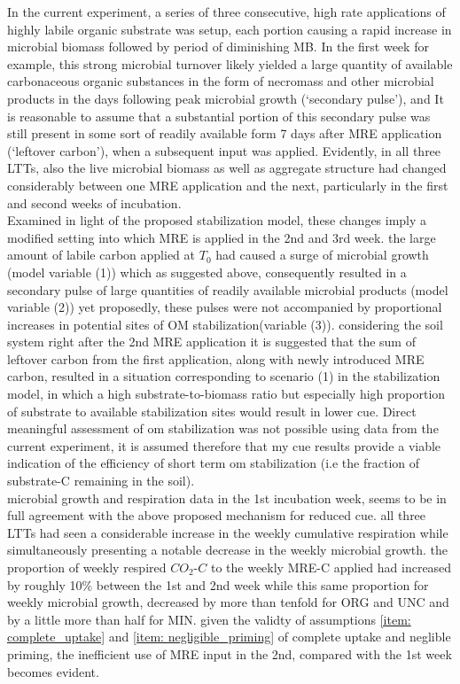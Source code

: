 \documentclass[12pt]{report}
\begin{document}
		In the current experiment, a series of three consecutive, high rate applications of highly labile organic substrate was setup, each portion causing a rapid increase in microbial biomass followed by period of diminishing MB. In the first week for example, this strong microbial turnover likely yielded a large quantity of available carbonaceous organic substances in the form of necromass and other microbial products in the days following peak microbial growth
		(‘secondary pulse’),
		and It is reasonable to assume that a substantial portion of this secondary pulse was still present in some sort of readily available form 7 days after MRE application (‘leftover carbon’), when a subsequent input was applied.
		Evidently, in all three LTTs, also the live microbial biomass as well as  aggregate structure had changed considerably between one MRE application and the next, particularly in the first and second weeks of incubation.\\
		Examined in light of the proposed stabilization model, these changes imply a modified setting into which MRE is applied in the 2nd and 3rd week. the large amount of labile carbon applied at $ T_0 $ had caused a surge of microbial growth (model variable (1)) which as suggested above, consequently resulted in a secondary pulse of large quantities of readily available microbial products (model variable (2)) yet proposedly, these pulses were not accompanied by proportional increases in potential sites of OM stabilization(variable (3)). considering the soil system right after the 2nd MRE application it is suggested that the sum of leftover carbon from the first application, along with newly introduced MRE carbon, resulted in a situation corresponding to scenario (1) in the stabilization model,  in which a high substrate-to-biomass ratio but especially high proportion of substrate to available stabilization sites would result in lower \gls{cue}.
		Direct meaningful  assessment of \gls{om} stabilization was not possible using data from the current experiment,
		it is assumed therefore that my \gls{cue} results provide a viable indication of the efficiency of short term \gls{om} stabilization (i.e the fraction of substrate-C remaining in the soil).\\
		microbial growth and respiration data in the 1st incubation week, seems to be in full agreement with the above proposed mechanism for reduced \gls{cue}. all three LTTs had seen a considerable increase in the weekly cumulative respiration while simultaneously presenting a notable decrease in the weekly microbial growth. the proportion of weekly respired $ CO_2 $-$ C $ to the weekly MRE-C applied had increased by roughly 10\% between the 1st and 2nd week while this same proportion for weekly microbial growth, decreased by more than tenfold for ORG and UNC and by a little more than half for MIN. given the validty of assumptions \ref{item: complete_uptake} and \ref{item: negligible_priming} of complete uptake and neglible priming, the inefficient use of MRE input in the 2nd, compared with the 1st week becomes evident. \\
\end{document}
